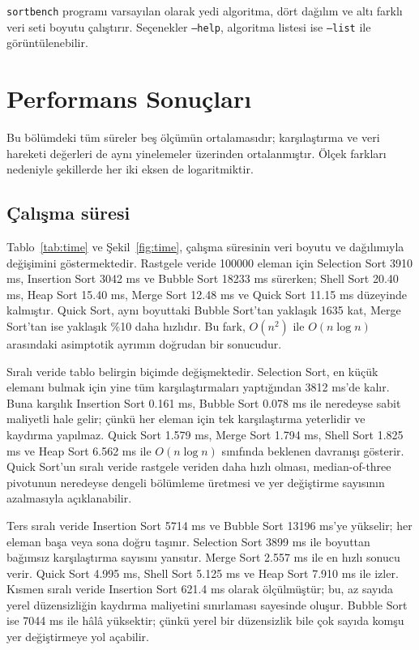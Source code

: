 \documentclass[12pt,a4paper]{article}
\begin{document}
\texttt{sortbench} programı varsayılan olarak yedi algoritma, dört dağılım ve
altı farklı veri seti boyutu çalıştırır. Seçenekler \texttt{--help}, algoritma listesi ise
\texttt{--list} ile görüntülenebilir.

\section{Performans Sonuçları}

Bu bölümdeki tüm süreler beş ölçümün ortalamasıdır; karşılaştırma ve veri
hareketi değerleri de aynı yinelemeler üzerinden ortalanmıştır. Ölçek farkları
nedeniyle şekillerde her iki eksen de logaritmiktir.



\subsection{Çalışma süresi}

Tablo~\ref{tab:time} ve Şekil~\ref{fig:time}, çalışma süresinin veri boyutu ve
dağılımıyla değişimini göstermektedir. Rastgele veride 100000 eleman için
Selection Sort 3910 ms, Insertion Sort 3042 ms ve Bubble Sort 18233 ms
sürerken; Shell Sort 20.40 ms, Heap Sort 15.40 ms, Merge Sort 12.48 ms ve Quick
Sort 11.15 ms düzeyinde kalmıştır. Quick Sort, aynı boyuttaki Bubble Sort'tan
yaklaşık 1635 kat, Merge Sort'tan ise yaklaşık \%10 daha hızlıdır. Bu fark,
$O(n^2)$ ile $O(n \log n)$ arasındaki asimptotik ayrımın doğrudan bir
sonucudur.



Sıralı veride tablo belirgin biçimde değişmektedir. Selection Sort, en küçük
elemanı bulmak için yine tüm karşılaştırmaları yaptığından 3812 ms'de kalır.
Buna karşılık Insertion Sort 0.161 ms, Bubble Sort 0.078 ms ile neredeyse sabit
maliyetli hale gelir; çünkü her eleman için tek karşılaştırma yeterlidir ve
kaydırma yapılmaz. Quick Sort 1.579 ms, Merge Sort 1.794 ms, Shell Sort 1.825 ms
ve Heap Sort 6.562 ms ile $O(n \log n)$ sınıfında beklenen davranışı gösterir.
Quick Sort'un sıralı veride rastgele veriden daha hızlı olması, median-of-three
pivotunun neredeyse dengeli bölümleme üretmesi ve yer değiştirme sayısının
azalmasıyla açıklanabilir.

Ters sıralı veride Insertion Sort 5714 ms ve Bubble Sort 13196 ms'ye
yükselir; her eleman başa veya sona doğru taşınır. Selection Sort 3899 ms ile
boyuttan bağımsız karşılaştırma sayısını yansıtır. Merge Sort 2.557 ms ile en
hızlı sonucu verir. Quick Sort 4.995 ms, Shell Sort 5.125 ms ve Heap Sort
7.910 ms ile izler. Kısmen sıralı veride Insertion Sort 621.4 ms olarak ölçülmüştür;
bu, az sayıda yerel düzensizliğin kaydırma maliyetini sınırlaması sayesinde
oluşur. Bubble Sort ise 7044 ms ile hâlâ yüksektir; çünkü yerel bir düzensizlik
bile çok sayıda komşu yer değiştirmeye yol açabilir.
\end{document}
